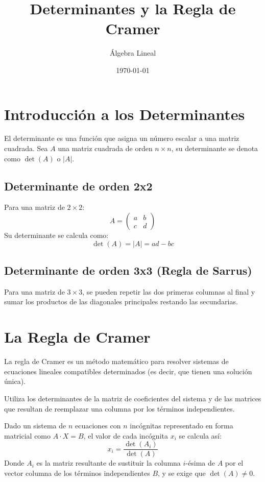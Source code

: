 \documentclass[12pt, a4paper]{article}
\title{Determinantes y la Regla de Cramer}
\author{Álgebra Lineal}
\date{\today}
\begin{document}
	
	\maketitle
	
	\section{Introducción a los Determinantes}
	El determinante es una función que asigna un número escalar a una matriz cuadrada. Sea $A$ una matriz cuadrada de orden $n \times n$, su determinante se denota como $\det(A)$ o $|A|$.
	
	\subsection{Determinante de orden 2x2}
	Para una matriz de $2 \times 2$:
	\[
	A = \begin{pmatrix} a & b \\ c & d \end{pmatrix}
	\]
	Su determinante se calcula como:
	\[
	\det(A) = |A| = ad - bc
	\]
	
	\subsection{Determinante de orden 3x3 (Regla de Sarrus)}
	Para una matriz de $3 \times 3$, se pueden repetir las dos primeras columnas al final y sumar los productos de las diagonales principales restando las secundarias.
	
	\section{La Regla de Cramer}
	La regla de Cramer es un método matemático para resolver sistemas de ecuaciones lineales compatibles determinados (es decir, que tienen una solución única). 
	
	Utiliza los determinantes de la matriz de coeficientes del sistema y de las matrices que resultan de reemplazar una columna por los términos independientes.
	
	Dado un sistema de $n$ ecuaciones con $n$ incógnitas representado en forma matricial como $A \cdot X = B$, el valor de cada incógnita $x_i$ se calcula así:
	\[
	x_i = \frac{\det(A_i)}{\det(A)}
	\]
	Donde $A_i$ es la matriz resultante de sustituir la columna $i$-ésima de $A$ por el vector columna de los términos independientes $B$, y se exige que $\det(A) \neq 0$.
	
\end{document}
